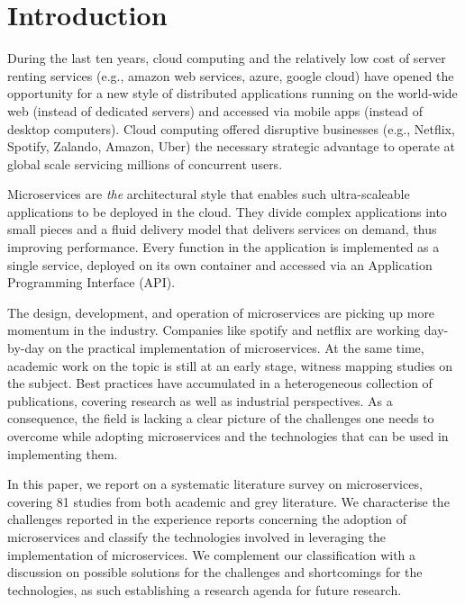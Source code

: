 
\section{Introduction}

During the last ten years, cloud computing and the relatively low cost of server renting services (e.g., amazon web services, azure, google cloud) have opened the opportunity for a new style of distributed applications running on the world-wide web (instead of dedicated servers) and accessed via mobile apps (instead of desktop computers).
Cloud computing offered disruptive businesses (e.g., Netflix, Spotify, Zalando, Amazon, Uber) the necessary strategic advantage to operate at global scale servicing millions of concurrent users.

Microservices are \emph{the} architectural style that enables such ultra-scaleable applications to be deployed in the cloud.
They divide complex applications into small pieces and a fluid delivery model that delivers services on demand, thus improving performance.\cite{Larrucea2018}
Every function in the application is implemented as a single service, deployed on its own container and accessed via an Application Programming Interface (API).\cite{Danbettinger2019}

The design, development, and operation of microservices are picking up more momentum in the industry.
Companies like spotify and netflix are working day-by-day on the practical implementation of microservices.\cite{Kevin2015, Meshenberg2016}
At the same time, academic work on the topic is still at an early stage, witness mapping studies on the subject.\cite{Soldani2018, Dragoni2017, Olaf2016}
Best practices have accumulated in a heterogeneous collection of publications, covering research as well as industrial perspectives.
As a consequence, the field is lacking a clear picture of the challenges one needs to overcome while adopting microservices and the technologies that can be used in implementing them.

In this paper, we report on a systematic literature survey on microservices, covering 81 studies from both academic and grey literature. %
We characterise the challenges reported in the experience reports concerning the adoption of microservices and classify the technologies involved in leveraging the implementation of microservices.
We complement our classification with a discussion on possible solutions for the challenges and shortcomings for the technologies, as such establishing a research agenda for future research.


